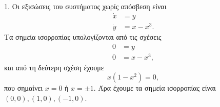 \begin{solution}
    1. Οι εξισώσεις του συστήματος χωρίς απόσβεση είναι
    \begin{align*}
        \dot{x} &= y \\
        \dot{y} &= x - x^3.
    \end{align*}
    Τα σημεία ισορροπίας υπολογίζονται από τις σχέσεις
    \begin{align*}
        0 &= y \\
        0 &= x - x^3,
    \end{align*}
    και από τη δεύτερη σχέση έχουμε
    \begin{equation*}
        x(1 - x^2) = 0,
    \end{equation*}
    που σημαίνει \( x = 0 \) ή \( x = \pm 1 \). Άρα έχουμε τα σημεία
    ισορροπίας είναι \( (0, 0), (1, 0), (-1, 0) \).


\end{solution}
